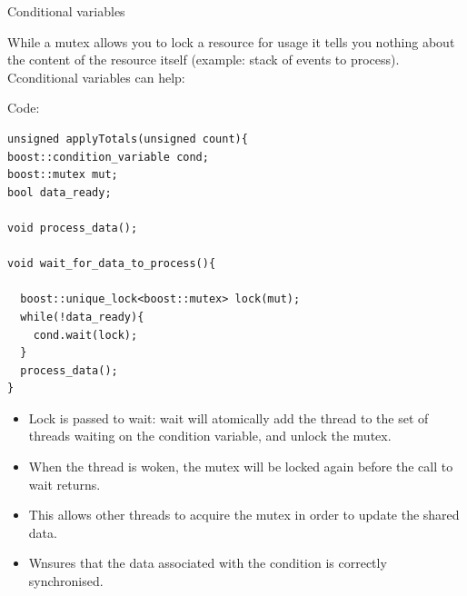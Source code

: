 \documentclass[8pt]{beamer}
\begin{document}
\begin{frame}[fragile]{Conditional variables}
 
While a mutex allows you to lock a resource for usage it tells you nothing about the content of the resource itself (example: stack of events to process). Cconditional variables can help:

\begin{exampleblock}{Code:}
 
\begin{lstlisting}
unsigned applyTotals(unsigned count){
boost::condition_variable cond;
boost::mutex mut;
bool data_ready;

void process_data();

void wait_for_data_to_process(){

  boost::unique_lock<boost::mutex> lock(mut);
  while(!data_ready){
    cond.wait(lock);
  }
  process_data();
}
\end{lstlisting}

\end{exampleblock}

\begin{itemize}
  \item Lock is passed to wait: wait will atomically add the thread to the set of threads waiting on the condition variable, and unlock the mutex.
  \item When the thread is woken, the mutex will be locked again before the call to wait returns.
  \item This allows other threads to acquire the mutex in order to update the shared data.
  \item Wnsures that the data associated with the condition is correctly synchronised.
\end{itemize}

\end{frame}
\end{document}
